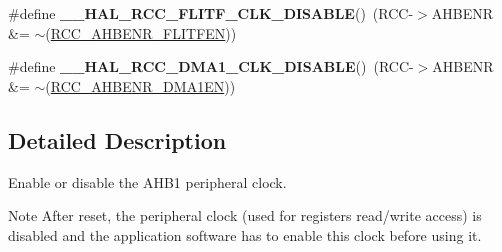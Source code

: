 \begin{DoxyCompactItemize}
\item 
\hypertarget{group___r_c_c___peripheral___clock___enable___disable_ga3ecbf76738d7f2b8deb65847614f7574}{\#define {\bfseries \-\_\-\-\_\-\-H\-A\-L\-\_\-\-R\-C\-C\-\_\-\-F\-L\-I\-T\-F\-\_\-\-C\-L\-K\-\_\-\-D\-I\-S\-A\-B\-L\-E}()~(R\-C\-C-\/$>$A\-H\-B\-E\-N\-R \&= $\sim$(\hyperlink{group___peripheral___registers___bits___definition_ga67a12de126652d191a1bc2c114c3395a}{R\-C\-C\-\_\-\-A\-H\-B\-E\-N\-R\-\_\-\-F\-L\-I\-T\-F\-E\-N}))}\label{group___r_c_c___peripheral___clock___enable___disable_ga3ecbf76738d7f2b8deb65847614f7574}

\item 
\hypertarget{group___r_c_c___peripheral___clock___enable___disable_ga569dc8b9e178a8afab2664fdf87f46c5}{\#define {\bfseries \-\_\-\-\_\-\-H\-A\-L\-\_\-\-R\-C\-C\-\_\-\-D\-M\-A1\-\_\-\-C\-L\-K\-\_\-\-D\-I\-S\-A\-B\-L\-E}()~(R\-C\-C-\/$>$A\-H\-B\-E\-N\-R \&= $\sim$(\hyperlink{group___peripheral___registers___bits___definition_gac8c3053f1ce37c9f643f0e31471927ea}{R\-C\-C\-\_\-\-A\-H\-B\-E\-N\-R\-\_\-\-D\-M\-A1\-E\-N}))}\label{group___r_c_c___peripheral___clock___enable___disable_ga569dc8b9e178a8afab2664fdf87f46c5}

\end{DoxyCompactItemize}


\subsection{Detailed Description}
Enable or disable the A\-H\-B1 peripheral clock. \begin{DoxyNote}{Note}
After reset, the peripheral clock (used for registers read/write access) is disabled and the application software has to enable this clock before using it. 
\end{DoxyNote}


